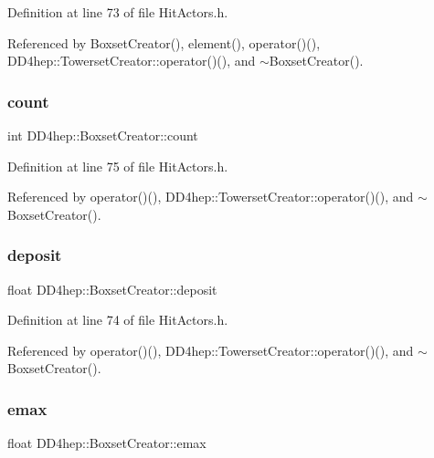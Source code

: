 Definition at line 73 of file Hit\+Actors.\+h.



Referenced by Boxset\+Creator(), element(), operator()(), D\+D4hep\+::\+Towerset\+Creator\+::operator()(), and $\sim$\+Boxset\+Creator().

\hypertarget{struct_d_d4hep_1_1_boxset_creator_a3c377c27632c9469ef4f821e24fec619}{}\label{struct_d_d4hep_1_1_boxset_creator_a3c377c27632c9469ef4f821e24fec619} 
\subsubsection{\texorpdfstring{count}{count}}
{\footnotesize\ttfamily int D\+D4hep\+::\+Boxset\+Creator\+::count}



Definition at line 75 of file Hit\+Actors.\+h.



Referenced by operator()(), D\+D4hep\+::\+Towerset\+Creator\+::operator()(), and $\sim$\+Boxset\+Creator().

\hypertarget{struct_d_d4hep_1_1_boxset_creator_af56e8b100eff17e8581503e334c3c6f6}{}\label{struct_d_d4hep_1_1_boxset_creator_af56e8b100eff17e8581503e334c3c6f6} 
\subsubsection{\texorpdfstring{deposit}{deposit}}
{\footnotesize\ttfamily float D\+D4hep\+::\+Boxset\+Creator\+::deposit}



Definition at line 74 of file Hit\+Actors.\+h.



Referenced by operator()(), D\+D4hep\+::\+Towerset\+Creator\+::operator()(), and $\sim$\+Boxset\+Creator().

\hypertarget{struct_d_d4hep_1_1_boxset_creator_a8be1434aa1149653df8e8b3677971dbe}{}\label{struct_d_d4hep_1_1_boxset_creator_a8be1434aa1149653df8e8b3677971dbe} 
\subsubsection{\texorpdfstring{emax}{emax}}
{\footnotesize\ttfamily float D\+D4hep\+::\+Boxset\+Creator\+::emax}



